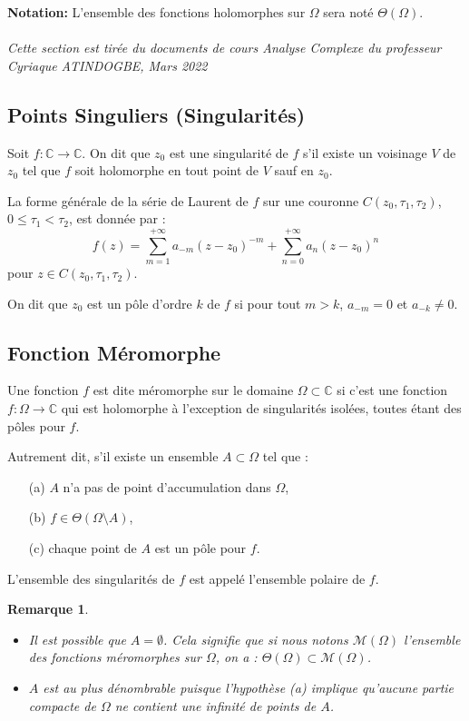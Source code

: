 \documentclass[12pt]{article}
\newtheorem{remark}{Remarque}
\begin{document}
\textbf{Notation:} L’ensemble des fonctions holomorphes sur $\Omega$ sera noté $\Theta(\Omega)$.
\\ \\
\textit{Cette section est tirée du documents de cours Analyse Complexe du professeur Cyriaque ATINDOGBE, Mars 2022}
\subsection{Points Singuliers (Singularités)}
Soit $f : \mathbb{C} \to \mathbb{C}$. On dit que $z_0$ est une singularité de $f$ s'il existe un voisinage $V$ de $z_0$ tel que $f$ soit holomorphe en tout point de $V$ sauf en $z_0$.

La forme générale de la série de Laurent de $f$ sur une couronne $C(z_0, \tau_1, \tau_2)$, $0 \leq \tau_1 < \tau_2$, est donnée par :
\[
f(z) = \sum_{m=1}^{+\infty} a_{-m} (z - z_0)^{-m} + \sum_{n=0}^{+\infty} a_n (z - z_0)^n
\]
pour $z \in C(z_0, \tau_1, \tau_2)$.

On dit que $z_0$ est un pôle d'ordre $k$ de $f$ si pour tout $m > k$, $a_{-m} = 0$ et $a_{-k} \neq 0$.

\subsection{Fonction Méromorphe}
Une fonction $f$ est dite méromorphe sur le domaine $\Omega \subset \mathbb{C}$ si c'est une fonction $f : \Omega \to \mathbb{C}$ qui est holomorphe à l'exception de singularités isolées, toutes étant des pôles pour $f$.

Autrement dit, s'il existe un ensemble $A \subset \Omega$ tel que :
\begin{itemize}
    \item[(a)] $A$ n'a pas de point d'accumulation dans $\Omega$,
    \item[(b)] $f \in \Theta(\Omega \setminus A)$,
    \item[(c)] chaque point de $A$ est un pôle pour $f$.
\end{itemize}
L'ensemble des singularités de $f$ est appelé l'ensemble polaire de $f$.

\begin{remark}
\begin{itemize}
    \item Il est possible que $A = \emptyset$. Cela signifie que si nous notons $\mathcal{M}(\Omega)$ l'ensemble des fonctions méromorphes sur $\Omega$, on a : $\Theta(\Omega) \subset \mathcal{M}(\Omega)$.
    \item $A$ est au plus dénombrable puisque l'hypothèse (a) implique qu'aucune partie compacte de $\Omega$ ne contient une infinité de points de $A$.
\end{itemize}
\end{remark}
\end{document}
